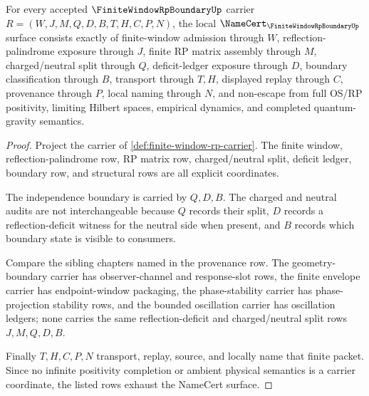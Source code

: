 \begin{theorem}
\label{thm:finite-window-rp-independence-boundary}
For every accepted $\FiniteWindowRpBoundaryUp$ carrier $R=(W,J,M,Q,D,B,T,H,C,P,N)$, the local $\NameCert_{\FiniteWindowRpBoundaryUp}$ surface consists exactly of finite-window admission through $W$, reflection-palindrome exposure through $J$, finite RP matrix assembly through $M$, charged/neutral split through $Q$, deficit-ledger exposure through $D$, boundary classification through $B$, transport through $T,H$, displayed replay through $C$, provenance through $P$, local naming through $N$, and non-escape from full OS/RP positivity, limiting Hilbert spaces, empirical dynamics, and completed quantum-gravity semantics.
\end{theorem}
\begin{proof}
Project the carrier of \autoref{def:finite-window-rp-carrier}. The finite window, reflection-palindrome row, RP matrix row, charged/neutral split, deficit ledger, boundary row, and structural rows are all explicit coordinates.

The independence boundary is carried by $Q,D,B$. The charged and neutral audits are not interchangeable because $Q$ records their split, $D$ records a reflection-deficit witness for the neutral side when present, and $B$ records which boundary state is visible to consumers.

Compare the sibling chapters named in the provenance row. The geometry-boundary carrier has observer-channel and response-slot rows, the finite envelope carrier has endpoint-window packaging, the phase-stability carrier has phase-projection stability rows, and the bounded oscillation carrier has oscillation ledgers; none carries the same reflection-deficit and charged/neutral split rows $J,M,Q,D,B$.

Finally $T,H,C,P,N$ transport, replay, source, and locally name that finite packet. Since no infinite positivity completion or ambient physical semantics is a carrier coordinate, the listed rows exhaust the NameCert surface.
\end{proof}

